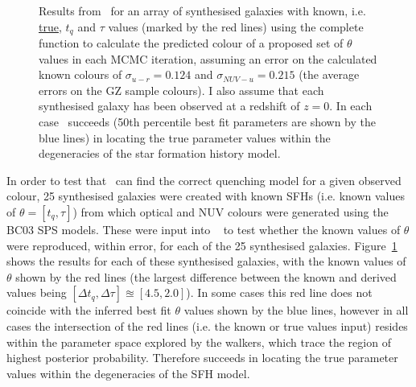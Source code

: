 \begin{figure}
\caption[Testing \starpy]{Results from \starpy ~for an array of synthesised galaxies with known, i.e. \underline{true}, $t_q$ and $\tau$ values (marked by the red lines) using the complete function to calculate the predicted colour of a proposed set of $\theta$ values in each MCMC iteration, assuming an error on the calculated known colours of $\sigma_{u-r} = 0.124$ and $\sigma_{NUV-u} = 0.215$ (the average errors on the GZ sample colours). I also assume that each synthesised galaxy has been observed at a redshift of $z=0$. In each case \starpy ~succeeds (50th percentile best fit parameters are shown by the blue lines) in locating the true parameter values within the degeneracies of the star formation history model.}
\label{test_mosaic}
\end{figure}

In order to test that \starpy ~can find the correct quenching model for a given observed colour, 25 synthesised galaxies were created with known SFHs (i.e. known values of $\theta = [t_q, \tau]$) from which optical and NUV colours were generated using the BC03 SPS models. These were input into \starpy ~ to test whether the known values of $\theta$ were reproduced, within error, for each of the 25 synthesised galaxies. Figure~\ref{test_mosaic} shows the results for each of these synthesised galaxies, with the known values of $\theta$ shown by the red lines (the largest difference between the known and derived values being $[\Delta t_q, \Delta \tau] \approxeq [4.5, 2.0]$). In some cases this red line does not coincide with the inferred best fit $\theta$ values shown by the blue lines, however in all cases the intersection of the red lines (i.e. the known or true values input) resides within the parameter space explored by the walkers, which trace the region of highest posterior probability. Therefore \starpy succeeds in locating the true parameter values within the degeneracies of the SFH model. 

